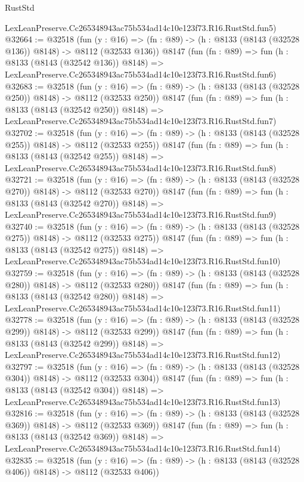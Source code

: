 \begin{lexlean}{RustStd}
\begin{coremodule}
    LexLeanPreserve.Cc265348943ac75b534ad14c10e123f73.R16.RustStd.fun5)
@32664 := @32518
    (fun (y : @16) => (fn : @89) -> (h : @8133 (@8143 (@32528 @136)) @8148) -> @8112 (@32533 @136))
    @8147
    (fun (fn : @89) =>
    fun (h : @8133 (@8143 (@32542 @136)) @8148) =>
    LexLeanPreserve.Cc265348943ac75b534ad14c10e123f73.R16.RustStd.fun6)
@32683 := @32518
    (fun (y : @16) => (fn : @89) -> (h : @8133 (@8143 (@32528 @250)) @8148) -> @8112 (@32533 @250))
    @8147
    (fun (fn : @89) =>
    fun (h : @8133 (@8143 (@32542 @250)) @8148) =>
    LexLeanPreserve.Cc265348943ac75b534ad14c10e123f73.R16.RustStd.fun7)
@32702 := @32518
    (fun (y : @16) => (fn : @89) -> (h : @8133 (@8143 (@32528 @255)) @8148) -> @8112 (@32533 @255))
    @8147
    (fun (fn : @89) =>
    fun (h : @8133 (@8143 (@32542 @255)) @8148) =>
    LexLeanPreserve.Cc265348943ac75b534ad14c10e123f73.R16.RustStd.fun8)
@32721 := @32518
    (fun (y : @16) => (fn : @89) -> (h : @8133 (@8143 (@32528 @270)) @8148) -> @8112 (@32533 @270))
    @8147
    (fun (fn : @89) =>
    fun (h : @8133 (@8143 (@32542 @270)) @8148) =>
    LexLeanPreserve.Cc265348943ac75b534ad14c10e123f73.R16.RustStd.fun9)
@32740 := @32518
    (fun (y : @16) => (fn : @89) -> (h : @8133 (@8143 (@32528 @275)) @8148) -> @8112 (@32533 @275))
    @8147
    (fun (fn : @89) =>
    fun (h : @8133 (@8143 (@32542 @275)) @8148) =>
    LexLeanPreserve.Cc265348943ac75b534ad14c10e123f73.R16.RustStd.fun10)
@32759 := @32518
    (fun (y : @16) => (fn : @89) -> (h : @8133 (@8143 (@32528 @280)) @8148) -> @8112 (@32533 @280))
    @8147
    (fun (fn : @89) =>
    fun (h : @8133 (@8143 (@32542 @280)) @8148) =>
    LexLeanPreserve.Cc265348943ac75b534ad14c10e123f73.R16.RustStd.fun11)
@32778 := @32518
    (fun (y : @16) => (fn : @89) -> (h : @8133 (@8143 (@32528 @299)) @8148) -> @8112 (@32533 @299))
    @8147
    (fun (fn : @89) =>
    fun (h : @8133 (@8143 (@32542 @299)) @8148) =>
    LexLeanPreserve.Cc265348943ac75b534ad14c10e123f73.R16.RustStd.fun12)
@32797 := @32518
    (fun (y : @16) => (fn : @89) -> (h : @8133 (@8143 (@32528 @304)) @8148) -> @8112 (@32533 @304))
    @8147
    (fun (fn : @89) =>
    fun (h : @8133 (@8143 (@32542 @304)) @8148) =>
    LexLeanPreserve.Cc265348943ac75b534ad14c10e123f73.R16.RustStd.fun13)
@32816 := @32518
    (fun (y : @16) => (fn : @89) -> (h : @8133 (@8143 (@32528 @369)) @8148) -> @8112 (@32533 @369))
    @8147
    (fun (fn : @89) =>
    fun (h : @8133 (@8143 (@32542 @369)) @8148) =>
    LexLeanPreserve.Cc265348943ac75b534ad14c10e123f73.R16.RustStd.fun14)
@32835 := @32518
    (fun (y : @16) => (fn : @89) -> (h : @8133 (@8143 (@32528 @406)) @8148) -> @8112 (@32533 @406))

\end{coremodule}
\end{lexlean}
